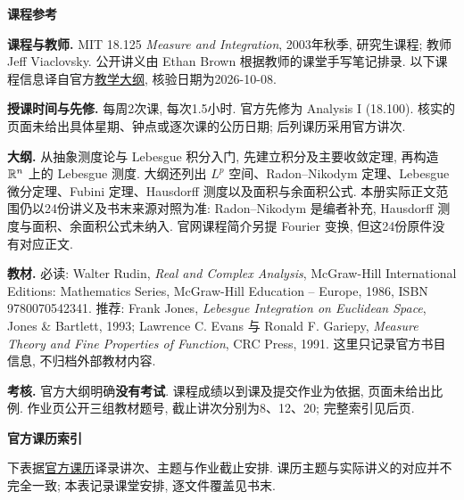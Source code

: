 {}
\begin{center}
{\color{structurecolor}\bfseries\fontsize{14.4}{20}\selectfont 课程参考\par}
\end{center}

\noindent\textbf{课程与教师.} MIT 18.125 \textit{Measure and Integration}, 2003年秋季, 研究生课程; 教师 Jeff Viaclovsky. 公开讲义由 Ethan Brown 根据教师的课堂手写笔记排录. 以下课程信息译自官方\href{https://ocw.mit.edu/courses/18-125-measure-and-integration-fall-2003/pages/syllabus/}{教学大纲}, 核验日期为2026-10-08.

\noindent\textbf{授课时间与先修.} 每周2次课, 每次1.5小时. 官方先修为 Analysis I (18.100). 核实的页面未给出具体星期、钟点或逐次课的公历日期; 后列课历采用官方讲次.

\noindent\textbf{大纲.} 从抽象测度论与 Lebesgue 积分入门, 先建立积分及主要收敛定理, 再构造 $\mathbb R^n$ 上的 Lebesgue 测度. 大纲还列出 $L^p$ 空间、Radon--Nikodym 定理、Lebesgue 微分定理、Fubini 定理、Hausdorff 测度以及面积与余面积公式. 本册实际正文范围仍以24份讲义及书末来源对照为准: Radon--Nikodym 是编者补充, Hausdorff 测度与面积、余面积公式未纳入. 官网课程简介另提 Fourier 变换, 但这24份原件没有对应正文.

\noindent\textbf{教材.} 必读: Walter Rudin, \textit{Real and Complex Analysis}, McGraw-Hill International Editions: Mathematics Series, McGraw-Hill Education -- Europe, 1986, ISBN 9780070542341. 推荐: Frank Jones, \textit{Lebesgue Integration on Euclidean Space}, Jones \& Bartlett, 1993; Lawrence C. Evans 与 Ronald F. Gariepy, \textit{Measure Theory and Fine Properties of Function}, CRC Press, 1991. 这里只记录官方书目信息, 不归档外部教材内容.

\noindent\textbf{考核.} 官方大纲明确\textbf{没有考试}. 课程成绩以到课及提交作业为依据, 页面未给出比例. 作业页公开三组教材题号, 截止讲次分别为8、12、20; 完整索引见后页.

\clearpage
{}
{}
\begin{center}
{\color{structurecolor}\bfseries\fontsize{14.4}{20}\selectfont 官方课历索引\par}
\end{center}
下表据\href{https://ocw.mit.edu/courses/18-125-measure-and-integration-fall-2003/pages/calendar/}{官方课历}译录讲次、主题与作业截止安排. 课历主题与实际讲义的对应并不完全一致; 本表记录课堂安排, 逐文件覆盖见书末.

